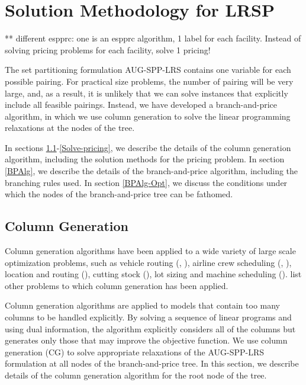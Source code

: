 
\section{Solution Methodology for LRSP}
\label{SolnMethod}

** different espprc: one is an espprc algorithm, 1 label for 
each facility. Instead of solving pricing problems for each facility, solve 
1 pricing!

The set partitioning formulation AUG-SPP-LRS contains one variable for each possible
pairing. For practical size problems, the number of pairing will be very
large, and, as a result, it is unlikely that we can solve instances that 
explicitly include all feasible pairings. Instead, we have developed a branch-and-price
algorithm, in which we use column generation to solve the linear programming 
relaxations at the nodes of the tree. 

In sections \ref{ColGenAlg}-\ref{Solve-pricing}, we describe the details of the column generation
algorithm, including the solution methods for the pricing problem. In section \ref{BPAlg}, 
we describe the details of the branch-and-price algorithm, including the branching 
rules used. In section \ref{BPAlg-Opt}, we discuss the conditions under which the
nodes of the branch-and-price tree can be fathomed.   

\subsection {Column Generation}
\label{ColGenAlg}
Column generation algorithms have been applied to a wide variety of large scale 
optimization problems, such as vehicle routing (\citet{Agarwal}, \citet{Desrochers2}), 
airline crew scheduling (\citet{Anbil}, \citet{Vance}), location and routing (\citet{Berger05}), 
cutting stock (\citet{Vance2}), lot sizing and machine scheduling (\citet{Vanderbeck}). 
\citet{Lubbecke} list other problems to which column generation has been applied.

Column generation algorithms are applied to models that contain too many columns
to be handled explicitly.
By solving a sequence of linear programs and using dual information, the algorithm 
explicitly considers all of the columns but generates only those that may improve 
the objective function. We use column generation (CG) to solve appropriate relaxations
of the AUG-SPP-LRS formulation at all nodes of the branch-and-price tree. In this section,
we describe details of the column generation algorithm for the root node of the tree.


